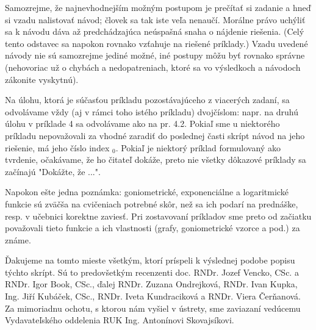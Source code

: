 Samozrejme, že najnevhodnejším možným postupom je prečítať si zadanie a hneď si
vzadu nalistovať návod; človek sa tak iste veľa nenaučí. Morálne právo uchýliť
sa k návodu dáva až predchádzajúca neúspašná snaha o nájdenie riešenia. (Celý
tento odstavec sa napokon rovnako vzťahuje na riešené príklady.) Vzadu uvedené
návody nie sú samozrejme jediné možné, iné postupy môžu byť rovnako správne
(nehovoriac už o chybách a nedopatreniach, ktoré sa vo výsledkoch a návodoch
zákonite vyskytnú).

Na úlohu, ktorá je súčasťou príkladu pozostávajúceho z viacerých zadaní, sa
odvolávame vždy (aj v rámci toho istého príkladu) dvojčíslom: napr. na druhú
úlohu v príklade 4 sa odvolávame ako na pr. 4.2. Pokiaľ sme u niektorého
príkladu nepovažovali za vhodné zaradiť do poslednej časti skrípt návod na jeho
riešenie, má jeho číslo index $_0$. Pokiaľ je niektorý príklad formulovaný ako
tvrdenie, očakávame, že ho čitateľ dokáže, preto nie všetky dôkazové príklady
sa začínajú "Dokážte, že ...".

Napokon ešte jedna poznámka: goniometrické, exponenciálne a logaritmické
funkcie sú zväčša na cvičeniach potrebné skôr, než sa ich podarí na prednáške,
resp. v učebnici korektne zaviesť. Pri zostavovaní príkladov sme preto od
začiatku považovali tieto funkcie a ich vlastnosti (grafy, goniometrické vzorce
a pod.) za známe.

Ďakujeme na tomto mieste všetkým, ktorí príspeli k výslednej podobe popisu
týchto skrípt. Sú to predovšetkým recenzenti doc. RNDr. Jozef Vencko, CSc. a
RNDr. Igor Book, CSc., ďalej RNDr. Zuzana Ondrejková, RNDr. Ivan Kupka, Ing.
Jiří Kubáček, CSc., RNDr. Iveta Kundraciková a RNDr. Viera Čerňanová. Za
mimoriadnu ochotu, s ktorou nám vyšiel v ústrety, sme zaviazaní vedúcemu
Vydavateľského oddelenia RUK Ing. Antonínovi Skovajsíkovi.
